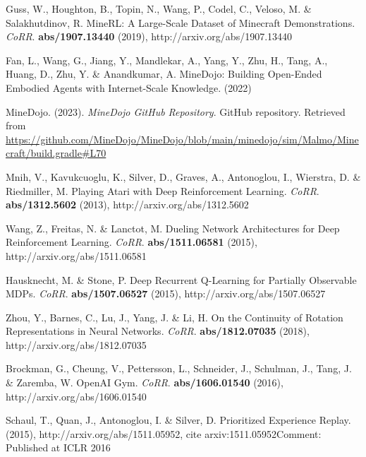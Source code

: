 \documentclass[oneside, under, ko]{snuthesis}
\begin{document}
%

\begin{thebibliography}{00}

    Guss, W., Houghton, B., Topin, N., Wang, P., Codel, C., Veloso, M. \& Salakhutdinov, R. MineRL: A Large-Scale Dataset of Minecraft Demonstrations. {\em CoRR}. \textbf{abs/1907.13440} (2019), http://arxiv.org/abs/1907.13440

    Fan, L., Wang, G., Jiang, Y., Mandlekar, A., Yang, Y., Zhu, H., Tang, A., Huang, D., Zhu, Y. \& Anandkumar, A. MineDojo: Building Open-Ended Embodied Agents with Internet-Scale Knowledge.  (2022)

    MineDojo. (2023). \textit{MineDojo GitHub Repository}. GitHub repository. Retrieved from \url{https://github.com/MineDojo/MineDojo/blob/main/minedojo/sim/Malmo/Minecraft/build.gradle#L70}

    Mnih, V., Kavukcuoglu, K., Silver, D., Graves, A., Antonoglou, I., Wierstra, D. \& Riedmiller, M. Playing Atari with Deep Reinforcement Learning. {\em CoRR}. \textbf{abs/1312.5602} (2013), http://arxiv.org/abs/1312.5602

    Wang, Z., Freitas, N. \& Lanctot, M. Dueling Network Architectures for Deep Reinforcement Learning. {\em CoRR}. \textbf{abs/1511.06581} (2015), http://arxiv.org/abs/1511.06581

    Hausknecht, M. \& Stone, P. Deep Recurrent Q-Learning for Partially Observable MDPs. {\em CoRR}. \textbf{abs/1507.06527} (2015), http://arxiv.org/abs/1507.06527

    Zhou, Y., Barnes, C., Lu, J., Yang, J. \& Li, H. On the Continuity of Rotation Representations in Neural Networks. {\em CoRR}. \textbf{abs/1812.07035} (2018), http://arxiv.org/abs/1812.07035

    Brockman, G., Cheung, V., Pettersson, L., Schneider, J., Schulman, J., Tang, J. \& Zaremba, W. OpenAI Gym. {\em CoRR}. \textbf{abs/1606.01540} (2016), http://arxiv.org/abs/1606.01540

    Schaul, T., Quan, J., Antonoglou, I. \& Silver, D. Prioritized Experience Replay.  (2015), http://arxiv.org/abs/1511.05952, cite arxiv:1511.05952Comment: Published at ICLR 2016


\end{thebibliography}
\end{document}
